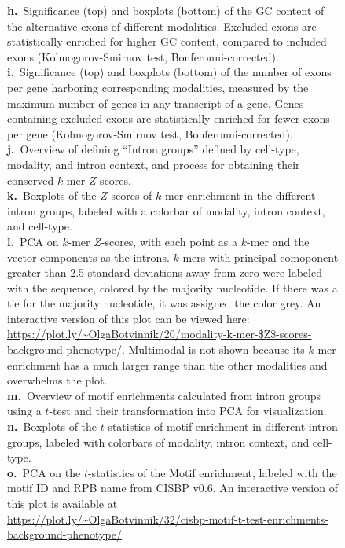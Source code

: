 \begin{figure}[h]
{\textbf{h.}~Significance (top) and boxplots (bottom) of the GC content of the alternative exons of different modalities. Excluded exons are statistically enriched for higher GC content, compared to included exons (Kolmogorov-Smirnov test, Bonferonni-corrected).\\
\textbf{i.}~Significance (top) and boxplots (bottom) of the number of exons per gene harboring corresponding modalities, measured by the maximum number of genes in any transcript of a gene. Genes containing excluded exons are statistically enriched for fewer exons per gene (Kolmogorov-Smirnov test, Bonferonni-corrected).\\
\textbf{j.}~Overview of defining ``Intron groups'' defined by cell-type, modality, and intron context, and process for obtaining their conserved $k$-mer $Z$-scores.\\
\textbf{k.}~Boxplots of the $Z$-scores of $k$-mer enrichment in the different intron groups, labeled with a colorbar of modality, intron context, and cell-type.\\
\textbf{l.}~PCA on $k$-mer $Z$-scores, with each point as a $k$-mer and the vector components as the introns. $k$-mers with principal comoponent greater than 2.5 standard deviations away from zero were labeled with the sequence, colored by the majority nucleotide. If there was a tie for the majority nucleotide, it was assigned the color grey. An interactive version of this plot can be viewed here: \url{https://plot.ly/~OlgaBotvinnik/20/modality-k-mer-$Z$-scores-background-phenotype/}. Multimodal is not shown because its $k$-mer enrichment has a much larger range than the other modalities and overwhelms the plot.\\
\textbf{m.}~Overview of motif enrichments calculated from intron groups using a $t$-test and their transformation into PCA for visualization.\\
\textbf{n.}~Boxplots of the $t$-statistics of motif enrichment in different intron groups, labeled with colorbars of modality, intron context, and cell-type.\\
\textbf{o.}~PCA on the $t$-statistics of the Motif enrichment, labeled with the motif ID and RPB name from CISBP v0.6. An interactive version of this plot is available at\\\url{https://plot.ly/~OlgaBotvinnik/32/cisbp-motif-t-test-enrichments-background-phenotype/}
}
\label{fig:supp_modality_features}

\end{figure}
\clearpage
